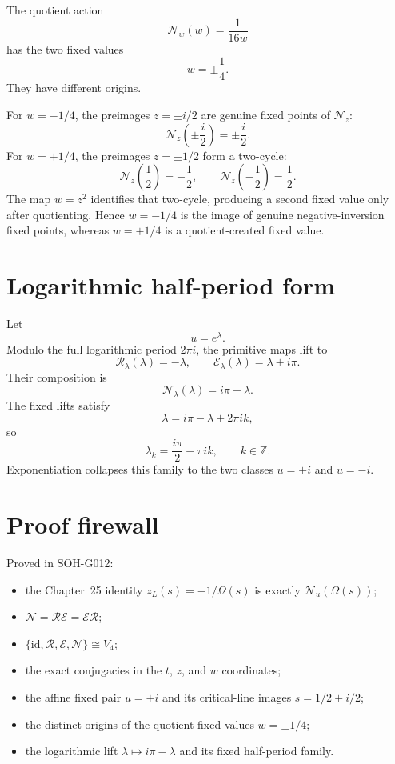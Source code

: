 The quotient action
\[
 \mathcal N_w(w)=\frac1{16w}
\]
has the two fixed values
\begin{equation}
 \boxed{w=\pm\frac14}.
 \label{eq:g012-w-fixed}
\end{equation}
They have different origins.

For \(w=-1/4\), the preimages \(z=\pm i/2\) are genuine fixed points of
\(\mathcal N_z\):
\[
 \mathcal N_z\!\left(\pm\frac{i}{2}\right)
 =\pm\frac{i}{2}.
\]
For \(w=+1/4\), the preimages \(z=\pm1/2\) form a two-cycle:
\[
 \mathcal N_z\!\left(\frac12\right)=-\frac12,
 \qquad
 \mathcal N_z\!\left(-\frac12\right)=\frac12.
\]
The map \(w=z^2\) identifies that two-cycle, producing a second fixed value only
after quotienting.  Hence \(w=-1/4\) is the image of genuine negative-inversion
fixed points, whereas \(w=+1/4\) is a quotient-created fixed value.

\section{Logarithmic half-period form}

Let
\[
 u=e^\lambda.
\]
Modulo the full logarithmic period \(2\pi i\), the primitive maps lift to
\[
 \mathcal R_\lambda(\lambda)=-\lambda,
 \qquad
 \mathcal E_\lambda(\lambda)=\lambda+i\pi.
\]
Their composition is
\begin{equation}
 \boxed{\mathcal N_\lambda(\lambda)=i\pi-\lambda}.
 \label{eq:g012-log-N}
\end{equation}
The fixed lifts satisfy
\[
 \lambda=i\pi-\lambda+2\pi i k,
\]
so
\begin{equation}
 \boxed{\lambda_k=\frac{i\pi}{2}+\pi i k},
 \qquad k\in\mathbb Z.
 \label{eq:g012-log-fixed}
\end{equation}
Exponentiation collapses this family to the two classes \(u=+i\) and \(u=-i\).

\section{Proof firewall}

Proved in SOH-G012:
\begin{itemize}
 \item the Chapter~25 identity \(z_L(s)=-1/\Omega(s)\) is exactly
       \(\mathcal N_u(\Omega(s))\);
 \item \(\mathcal N=\mathcal R\mathcal E=\mathcal E\mathcal R\);
 \item \(\{\mathrm{id},\mathcal R,\mathcal E,\mathcal N\}\cong V_4\);
 \item the exact conjugacies in the \(t\), \(z\), and \(w\) coordinates;
 \item the affine fixed pair \(u=\pm i\) and its critical-line images
       \(s=1/2\pm i/2\);
 \item the distinct origins of the quotient fixed values \(w=\pm1/4\);
 \item the logarithmic lift \(\lambda\mapsto i\pi-\lambda\) and its fixed
       half-period family.
\end{itemize}

